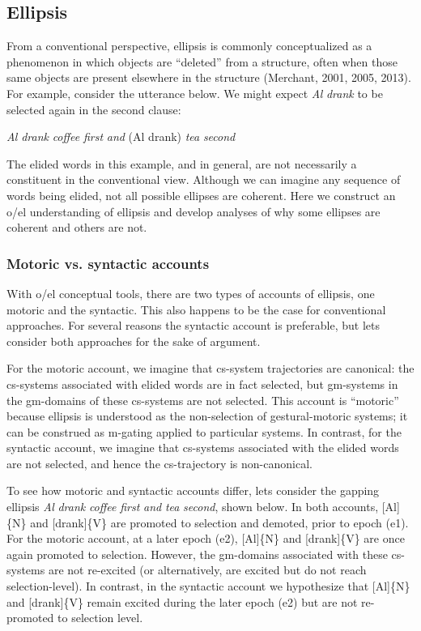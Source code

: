 \subsection{Ellipsis}

From a conventional perspective, ellipsis is commonly conceptualized as a phenomenon in which objects are “deleted” from a structure, often when those same objects are present elsewhere in the structure (Merchant, 2001, 2005, 2013). For example, consider the utterance below. We might expect \textit{Al} \textit{drank} to be selected again in the second clause:

    \textit{Al} \textit{drank} \textit{coffee} \textit{first} \textit{and} (Al drank) \textit{tea} \textit{second}

  The elided words in this example, and in general, are not necessarily a constituent in the conventional view. Although we can imagine any sequence of words being elided, not all possible ellipses are coherent. Here we construct an o/el understanding of ellipsis and develop analyses of why some ellipses are coherent and others are not.

\subsubsection{Motoric vs. syntactic accounts}

With o/el conceptual tools, there are two types of accounts of ellipsis, one motoric and the syntactic. This also happens to be the case for conventional approaches. For several reasons the syntactic account is preferable, but lets consider both approaches for the sake of argument. 

  For the motoric account, we imagine that cs-system trajectories are canonical: the cs-systems associated with elided words are in fact selected, but gm-systems in the gm-domains of these cs-systems are not selected. This account is “motoric” because ellipsis is understood as the non-selection of gestural-motoric systems; it can be construed as m-gating applied to particular systems. In contrast, for the syntactic account, we imagine that cs-systems associated with the elided words are not selected, and hence the cs-trajectory is non-canonical.

  To see how motoric and syntactic accounts differ, lets consider the gapping ellipsis \textit{Al} \textit{drank} \textit{coffee} \textit{first} \textit{and} \textit{tea} \textit{second}, shown below. In both accounts, [Al]\{N\} and [drank]\{V\} are promoted to selection and demoted, prior to epoch (e1). For the motoric account, at a later epoch (e2), [Al]\{N\} and [drank]\{V\} are once again promoted to selection. However, the gm-domains associated with these cs-systems are not re-excited (or alternatively, are excited but do not reach selection-level). In contrast, in the syntactic account we hypothesize that [Al]\{N\} and [drank]\{V\} remain excited during the later epoch (e2) but are not re-promoted to selection level. 

